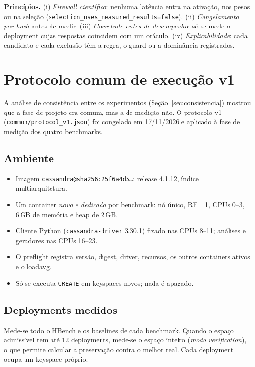 \documentclass[10pt,a4paper,twoside]{article}
\newcommand{\caixa}[1]{\par\smallskip\noindent\colorbox{boxbg}{\parbox{\dimexpr\linewidth-2\fboxsep}{#1}}\par\smallskip}
\theoremstyle{definition}\newtheorem{definicao}{Definição}
\begin{document}
\caixa{\textbf{Princípios.} (i) \emph{Firewall científico}: nenhuma latência entra na ativação, nos pesos ou na seleção (\texttt{selection\_uses\_measured\_results=false}). (ii) \emph{Congelamento por hash} antes de medir. (iii) \emph{Corretude antes de desempenho}: só se mede o deployment cujas respostas coincidem com um oráculo. (iv) \emph{Explicabilidade}: cada candidato e cada exclusão têm a regra, o guard ou a dominância registrados.}

\section{Protocolo comum de execução v1}\label{sec:protocolo}
A análise de consistência entre os experimentos (Seção~\ref{sec:consistencia}) mostrou que a fase de projeto era comum, mas a de medição não. O protocolo v1 (\texttt{common/protocol\_v1.json}) foi congelado em 17/11/2026 e aplicado à fase de medição dos quatro benchmarks.

\subsection{Ambiente}
\begin{itemize}
\item Imagem \texttt{cassandra@sha256:25f6a4d5\ldots}: release 4.1.12, índice multiarquitetura.
\item Um container \emph{novo e dedicado} por benchmark: nó único, RF\,=\,1, CPUs 0--3, 6\,GB de memória e heap de 2\,GB.
\item Cliente Python (\texttt{cassandra-driver} 3.30.1) fixado nas CPUs 8--11; análises e geradores nas CPUs 16--23.
\item O preflight registra versão, digest, driver, recursos, os outros containers ativos e o loadavg.
\item Só se executa \texttt{CREATE} em keyspaces novos; nada é apagado.
\end{itemize}

\subsection{Deployments medidos}
Mede-se todo o HBench e os baselines de cada benchmark. Quando o espaço admissível tem até 12 deployments, mede-se o espaço inteiro (\emph{modo verification}), o que permite calcular a preservação contra o melhor real. Cada deployment ocupa um keyspace próprio.
\end{document}

